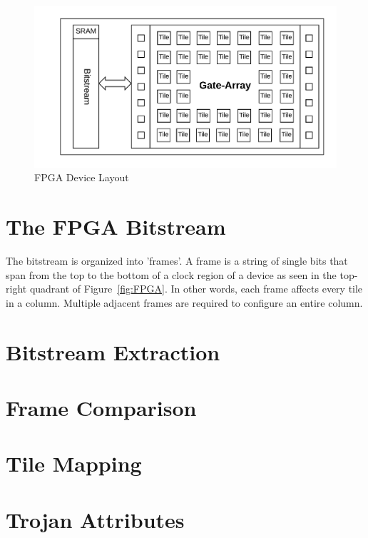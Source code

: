 \begin{figure}
\centering
\includegraphics[width=0.9\linewidth]{Figures/architecture}
\caption[FPGA Device Layout]{FPGA Device Layout}
\label{fig:architecture}
\end{figure}

\section{The \acrshort{FPGA} Bitstream} \label{sec:fpgaBitStream}
The \Xilinx bitstream is organized into 'frames'.
A frame is a string of single bits that span from the top to the bottom of a clock region of a device as seen in the top-right quadrant of Figure~\ref{fig:FPGA}.
In other words, each frame affects every tile in a column.
Multiple adjacent frames are required to configure an entire column. 
\section{Bitstream Extraction} \label{sec:bitstreamExtraction}
\section{Frame Comparison} \label{sec:frameComparison}
\section{Tile Mapping} \label{sec:tileMapping}
\section{Trojan Attributes} \label{sec:trojanAttributes}



